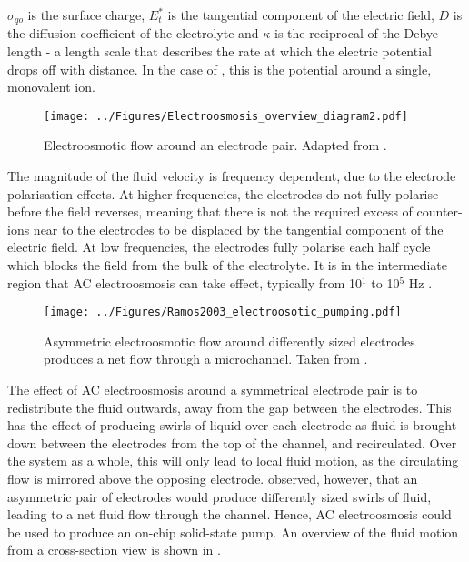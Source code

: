 $\sigma_{qo}$ is the surface charge, $E_{t}^{*}$ is the tangential component of the electric field, $D$ is the diffusion coefficient of the electrolyte and $\kappa$ is the reciprocal of the Debye length - a length scale that describes the rate at which the electric potential drops off with distance. In the case of , this is the potential around a single, monovalent ion.

\begin{figure}
 \centering
 \texttt{[image: ../Figures/Electroosmosis\_overview\_diagram2.pdf]}
 \caption[Electroosmotic flow around an electrode pair.]{Electroosmotic flow around an electrode pair. Adapted from \cite{Morgan:2003}.}
 \label{fig:Electroosmosis_overview_diagram}
\end{figure}

The magnitude of the fluid velocity is frequency dependent, due to the electrode polarisation effects. At higher frequencies, the electrodes do not fully polarise before the field reverses, meaning that there is not the required excess of counter-ions near to the electrodes to be displaced by the tangential component of the electric field. At low frequencies, the electrodes fully polarise each half cycle which blocks the field from the bulk of the electrolyte. It is in the intermediate region that AC electroosmosis can take effect, typically from 10$^{1}$ to 10$^{5}$ Hz \citep{Morgan:2003}.

\begin{figure}
 \centering
 \texttt{[image: ../Figures/Ramos2003\_electroosotic\_pumping.pdf]}
 \caption[Asymmetric electroosmotic flow around differently sized electrodes produces a net flow through a microchannel.]{Asymmetric electroosmotic flow around differently sized electrodes produces a net flow through a microchannel. Taken from \cite{Ramos:2003}.}
 \label{fig:Ramos2003_electroosotic_pumping}
\end{figure}

The effect of AC electroosmosis around a symmetrical electrode pair is to redistribute the fluid outwards, away from the gap between the electrodes. This has the effect of producing swirls of liquid over each electrode as fluid is brought down between the electrodes from the top of the channel, and recirculated. Over the system as a whole, this will only lead to local fluid motion, as the circulating flow is mirrored above the opposing electrode. \cite{Brown:2000} observed, however, that an asymmetric pair of electrodes would produce differently sized swirls of fluid, leading to a net fluid flow through the channel. Hence, AC electroosmosis could be used to produce an on-chip solid-state pump. An overview of the fluid motion from a cross-section view is shown in .

